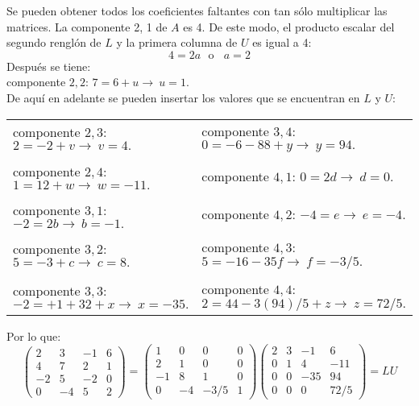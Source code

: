 \documentclass[11pt,letterpaper]{article}
\begin{document}
\begin{enumerate}
Se pueden obtener todos los coeficientes faltantes con tan sólo multiplicar las matrices. La
componente 2, 1 de $A$ es 4. De este modo, el producto escalar del segundo renglón de $L$ y la primera columna de $U$ es igual a 4:
$$4=2a \ \ \ \text{o}  \ \ \ \ a=2$$
Después se tiene:\\
componente $2,2$: $7=6+u \rightarrow \ u=1.$\\
De aquí en adelante se pueden insertar los valores que se encuentran en $L$ y $U$:
\begin{table}[H]
\centering
\begin{tabular}{l|l}
componente $2,3$: $2=-2+v \rightarrow \ v=4.$ & componente $3,4$: $0=-6-88+y \rightarrow \ y=94.$\\ \\
componente $2,4$: $1=12+w \rightarrow \ w=-11.$ & componente $4,1$: $0=2d \rightarrow \ d=0.$\\ \\
componente $3,1$: $-2=2b \rightarrow \ b=-1.$ & componente $4,2$: $-4=e \rightarrow \ e=-4.$\\ \\
componente $3,2$: $5=-3+c \rightarrow \ c=8.$ & componente $4,3$: $5=-16-35f \rightarrow \ f=-3/5.$\\ \\
componente $3,3$: $-2=+1+32+x \rightarrow \ x=-35.$ & componente $4,4$: $2=44-3(94)/5+z \rightarrow \ z=72/5.$\\ 
\end{tabular}
\end{table}
Por lo que:
\begin{equation*}
\left(\begin{array}{rrrr}
 2 &  3 & -1 & 6\\
 4 &  7 &  2 & 1\\
-2 &  5 & -2 & 0\\
 0 & -4 &  5 & 2
\end{array} \right) =
\left(\begin{array}{rrrr}
 1 &  0 &  0 & 0\\
 2 &  1 &  0 & 0\\
-1 &  8 &  1 & 0\\
 0 &  -4 & -3/5 & 1
\end{array} \right) \left(\begin{array}{rrrr}
 2 &  3 & -1 & 6\\
 0 &  1 &  4 & -11\\
 0 &  0 &  -35 & 94\\
 0 &  0 &  0 & 72/5
\end{array} \right)=LU

\end{equation*}
\end{enumerate}
\end{document}

